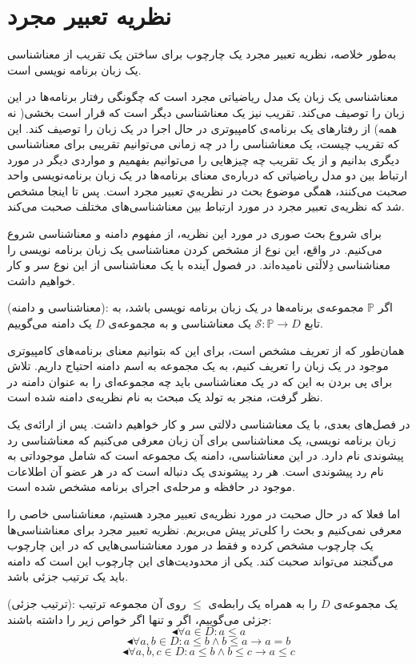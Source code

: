 \section{نظریه تعبیر مجرد}

به‌طور خلاصه، نظریه تعبیر مجرد یک چارچوب برای ساختن یک تقریب از معناشناسی یک زبان‌ برنامه نویسی است. 

معناشناسی یک زبان یک مدل ریاضیاتی مجرد است که چگونگی رفتار برنامه‌ها در این زبان را توصیف می‌کند. 
تقریب نیز یک معناشناسی دیگر است که قرار است بخشی( نه همه) از رفتارهای یک برنامه‌ی کامپیوتری در حال اجرا در یک زبان را توصیف کند. این که تقریب چیست، یک معناشناسی را در چه زمانی می‌توانیم تقریبی برای معناشناسی دیگری بدانیم و از یک تقریب چه چیزهایی را می‌توانیم بفهمیم و مواردی دیگر در مورد ارتباط بین دو مدل ریاضیاتی که درباره‌ی معنای برنامه‌ها در یک زبان برنامه‌نویسی واحد صحبت می‌کنند، همگی موضوع بحث در نظریه‌ي تعبیر مجرد است.
پس تا اینجا مشخص شد که نظریه‌ی تعبیر مجرد در مورد ارتباط بین معناشناسی‌های مختلف صحبت می‌کند. 

برای شروع بحث صوری در مورد این نظریه، از مفهوم دامنه و معناشناسی شروع می‌کنیم.
در واقع، این نوع از مشخص کردن معناشناسی یک زبان برنامه نویسی را معناشناسی دِلالَتی نامیده‌اند. در فصول آینده با یک معناشناسی از این نوع سر و کار خواهیم داشت.
\begin{defn}
	(معناشناسی و دامنه): اگر $\mathbb{P}$ مجموعه‌ی برنامه‌ها در یک زبان برنامه نویسی باشد، به تابع 
	$\mathcal{S}:\mathbb{P} \rightarrow D$
	یک معناشناسی و به مجموعه‌ی $D$ یک دامنه می‌گوییم.
\end{defn}
همان‌طور که از تعریف مشخص است، برای این که بتوانیم معنای برنامه‌های کامپیوتری موجود در یک زبان را تعریف کنیم، به یک مجموعه به اسم دامنه احتیاج داریم. تلاش برای پی بردن به این که در یک معناشناسی باید چه مجموعه‌ای را به عنوان دامنه در نظر گرفت، منجر به تولد یک مبحث به نام نظریه‌ی دامنه شده است.

در فصل‌های بعدی، با یک معناشناسی دلالتی سر و کار خواهیم داشت. 
پس از ارائه‌ی یک زبان برنامه نویسی، یک معناشناسی برای آن زبان معرفی می‌کنیم که معناشناسی رد پیشوندی نام دارد. در این معناشناسی، دامنه یک مجموعه است که شامل موجوداتی به نام رد پیشوندی است. هر رد پیشوندی یک دنباله است که در هر عضو آن اطلاعات موجود در حافظه و مرحله‌ی اجرای برنامه مشخص شده است. 

اما فعلا که در حال صحبت در مورد نظریه‌ی تعبیر مجرد هستیم، معناشناسی خاصی را معرفی نمی‌کنیم و بحث را کلی‌تر پیش می‌بریم. نظریه تعبیر مجرد برای معناشناسی‌ها یک چارچوب مشخص کرده و فقط در مورد معناشناسی‌هایی که در این چارچوب می‌گنجند می‌تواند صحبت کند. یکی از محدودیت‌های این چارچوب این است که دامنه باید یک ترتیب جزئی باشد.
\begin{defn}
	(ترتیب جزئی): یک مجموعه‌ی $D$ را به همراه یک رابطه‌ی $\leq$ روی آن مجموعه ترتیب جزئی می‌گوییم، اگر و تنها اگر خواص زیر را داشته باشند:
	$$\blacktriangleleft \forall a \in D: a\leq a$$
	$$\blacktriangleleft \forall a,b \in D: a \leq b \land b \leq a \rightarrow a=b$$
	$$\blacktriangleleft \forall a,b,c \in D: a \leq b \land b \leq c \rightarrow a \leq c$$
\end{defn}

